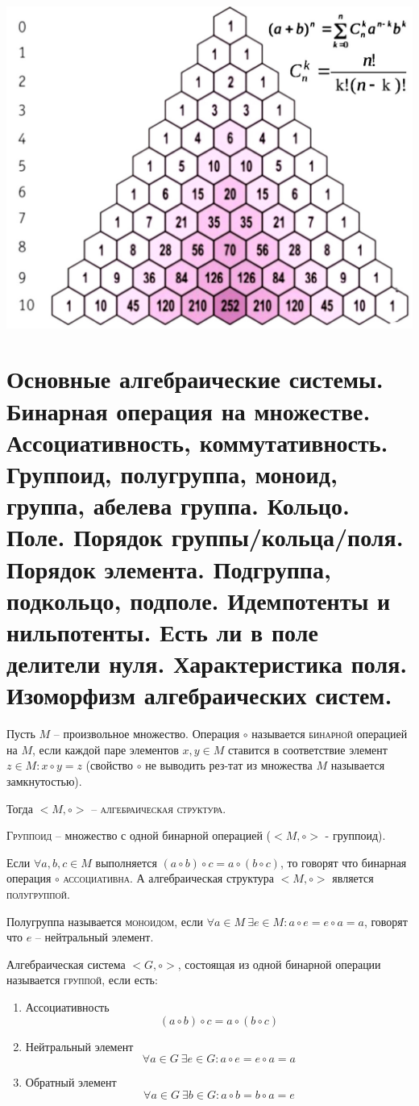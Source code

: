 \documentclass{article}
\begin{document}
\centerline{\includegraphics[width=0.5\linewidth]{tr_pascal.jpeg}}


\section{Основные алгебраические системы. Бинарная операция на множестве. Ассоциативность, коммутативность. Группоид, полугруппа, моноид, группа, абелева группа. Кольцо. Поле. Порядок группы/кольца/поля. Порядок элемента. Подгруппа, подкольцо, подполе. Идемпотенты и нильпотенты. Есть ли в поле делители нуля. Характеристика поля. Изоморфизм алгебраических систем.}

Пусть $M$ – произвольное множество. Операция $\circ$ называется \textsc{бинарной} операцией на $M$, если каждой паре элементов
$x,y\in M$ ставится в соответствие элемент $z\in M\colon x\circ y=z$ (свойство $\circ$ не выводить рез-тат из множества $M$ называется замкнутостью).

Тогда $<M, \circ>$ – \textsc{алгебраическая структура}.

\textsc{Группоид} – множество с одной бинарной операцией ($<M,\circ>$ - группоид).

Если $\forall a,b,c\in M$ выполняется $(a\circ b)\circ c=a\circ(b\circ c)$, то говорят что бинарная операция $\circ$ \textsc{ассоциативна}.
А алгебраическая структура $<M, \circ>$ является \textsc{полугруппой}.

Полугруппа называется \textsc{моноидом}, если $\forall a\in M \ \exists e\in M\colon a\circ e=e\circ a=a$, говорят что $e$ – нейтральный элемент.

Алгебраическая система $<G, \circ>$, состоящая из одной бинарной операции называется \textsc{группой}, если есть:
\begin{enumerate}
\item Ассоциативность
$$(a\circ b)\circ c=a\circ(b\circ c)$$
\item Нейтральный элемент
$$\forall a\in G \ \exists e\in G\colon a\circ e=e\circ a=a$$
\item Обратный элемент
$$\forall a\in G \ \exists b\in G\colon a\circ b=b\circ a=e$$
\end{enumerate}
\end{document}
